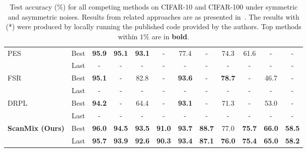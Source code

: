 \documentclass[review]{elsarticle}
\theoremstyle{plain}
\begin{document}
\begin{table*}[t!]
{\begin{tabular}{lc|cccc|cc||cccc}
\hline
 \multirow{2}{*}{PES~\citep{bai2021understanding}} & Best & \textbf{95.9} & \textbf{95.1} & \textbf{93.1} & - & 77.4 & - & 74.3 & 61.6 & 
 - & - \\
  & Last & - & - & - & - & - & - & - & - & - & - \\
\hline
 \multirow{2}{*}{FSR~\citep{zhang2021FSR}} & Best & \textbf{95.1} & - & 82.8 & - & \textbf{93.6} & - & \textbf{78.7} & - & 
 46.7 & - \\
  & Last & - & - & - & - & - & - & - & - & - & - \\
\hline
 \multirow{2}{*}{DRPL~\citep{ortego2019towards}} & Best & \textbf{94.2} & - & 64.4 & - & \textbf{93.1} & - & 71.3 & - & 
 53.0 & - \\
  & Last & - & - & - & - & - & - & - & - & - & - \\
\hline
\multirow{2}{*}{\textbf{ScanMix (Ours)}}& Best & \textbf{96.0} & \textbf{94.5} & \textbf{93.5} & \textbf{91.0} & \textbf{93.7} & \textbf{88.7} & 77.0 & \textbf{75.7} & \textbf{66.0} & \textbf{58.5}\\
    & Last & \textbf{95.7} & \textbf{93.9} & \textbf{92.6} & \textbf{90.3} & \textbf{93.4} & \textbf{87.1} & \textbf{76.0} & \textbf{75.4} & \textbf{65.0} & \textbf{58.2}\\
\hline
\end{tabular}
}
\caption{Test accuracy (\%) for all competing methods on CIFAR-10 and CIFAR-100 under symmetric and asymmetric noises. Results from related approaches are as presented in~\citep{li2020dividemix}. The results with (*) were produced by locally running the published code provided by the authors. Top methods within $1\%$ are in \textbf{bold}.} 
\label{tab:results_cifar}
\end{table*}
\end{document}
